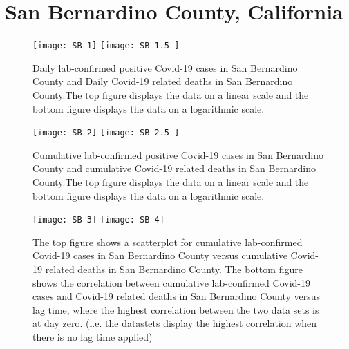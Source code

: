 \documentclass{article}
\begin{document}
\FloatBarrier


\section{San Bernardino County, California}

\begin{figure}[!htbp]
	\begin{center}
		\texttt{[image: SB 1]}
		\vspace{1mm}
		\texttt{[image: SB 1.5 ]}
		\caption{Daily lab-confirmed positive Covid-19 cases in San Bernardino County and Daily Covid-19 related deaths in San Bernardino County.The top figure displays the data on a linear scale and the bottom figure displays the data on a logarithmic scale.  }
		\label{fig:11}
	\end{center}
\end{figure}

\FloatBarrier

\begin{figure}[!htbp]
	\begin{center}
		\texttt{[image: SB 2]}
		\vspace{1mm}
		\texttt{[image: SB 2.5 ]}
		\caption{Cumulative lab-confirmed positive Covid-19 cases in San Bernardino County and cumulative Covid-19 related deaths in San Bernardino County.The top figure displays the data on a linear scale and the bottom figure displays the data on a logarithmic scale. }
		\label{fig:12}
	\end{center}
\end{figure}

\FloatBarrier

\begin{figure}[!htbp]
	\begin{center}
		\texttt{[image: SB 3]}
		\vspace{1mm}
		\texttt{[image: SB 4]}
		\caption{The top figure shows a scatterplot for cumulative lab-confirmed Covid-19 cases in San Bernardino County versus cumulative Covid-19 related deaths in San Bernardino County. The bottom figure shows the correlation between cumulative lab-confirmed Covid-19 cases and Covid-19 related deaths in San Bernardino County versus lag time, where the highest correlation between the two data sets is at day zero. (i.e. the datastets display the highest correlation when there is no lag time applied) }
		\label{fig:13}
	\end{center}
\end{figure}
\end{document}
